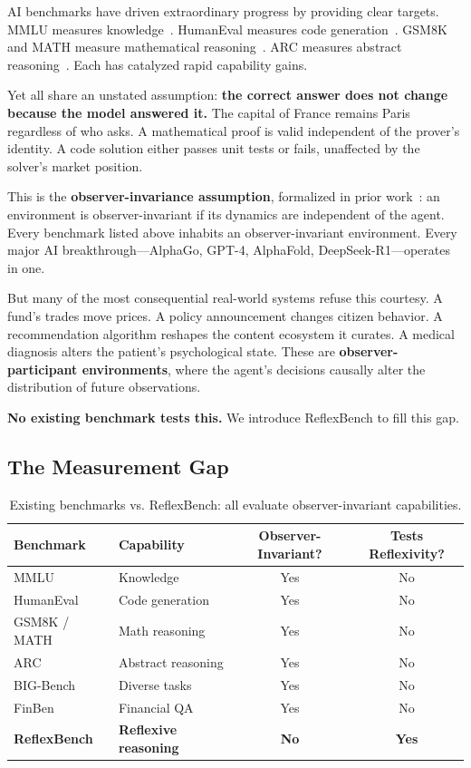 \documentclass{article}
\begin{document}
AI benchmarks have driven extraordinary progress by providing clear targets. MMLU measures knowledge~\citep{hendrycks2021}. HumanEval measures code generation~\citep{chen2021}. GSM8K and MATH measure mathematical reasoning~\citep{cobbe2021,hendrycks2021math}. ARC measures abstract reasoning~\citep{chollet2019}. Each has catalyzed rapid capability gains.

Yet all share an unstated assumption: \textbf{the correct answer does not change because the model answered it.} The capital of France remains Paris regardless of who asks. A mathematical proof is valid independent of the prover's identity. A code solution either passes unit tests or fails, unaffected by the solver's market position.

This is the \textbf{observer-invariance assumption}, formalized in prior work~\citep{zhang2026}: an environment is observer-invariant if its dynamics are independent of the agent. Every benchmark listed above inhabits an observer-invariant environment. Every major AI breakthrough---AlphaGo, GPT-4, AlphaFold, DeepSeek-R1---operates in one.

But many of the most consequential real-world systems refuse this courtesy. A fund's trades move prices. A policy announcement changes citizen behavior. A recommendation algorithm reshapes the content ecosystem it curates. A medical diagnosis alters the patient's psychological state. These are \textbf{observer-participant environments}, where the agent's decisions causally alter the distribution of future observations.

\textbf{No existing benchmark tests this.} We introduce ReflexBench to fill this gap.

\subsection{The Measurement Gap}

\begin{table}[h]
\centering
\caption{Existing benchmarks vs. ReflexBench: all evaluate observer-invariant capabilities.}
\label{tab:benchmark-gap}
\begin{tabular}{@{}llcc@{}}
\toprule
\textbf{Benchmark} & \textbf{Capability} & \textbf{Observer-Invariant?} & \textbf{Tests Reflexivity?} \\
\midrule
MMLU & Knowledge & Yes & No \\
HumanEval & Code generation & Yes & No \\
GSM8K / MATH & Math reasoning & Yes & No \\
ARC & Abstract reasoning & Yes & No \\
BIG-Bench & Diverse tasks & Yes & No \\
FinBen & Financial QA & Yes & No \\
\midrule
\textbf{ReflexBench} & \textbf{Reflexive reasoning} & \textbf{No} & \textbf{Yes} \\
\bottomrule
\end{tabular}
\end{table}
\end{document}
